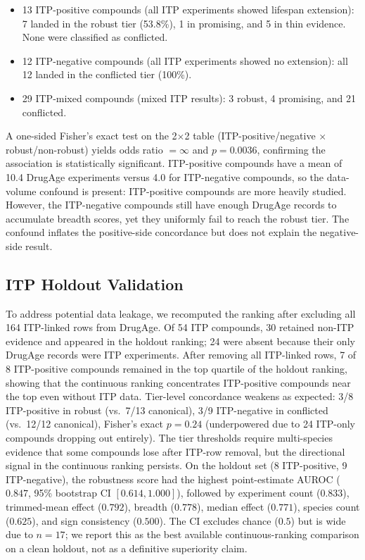 \documentclass[11pt]{article}
\begin{document}
\begin{itemize}
\item 13 ITP-positive compounds (all ITP experiments showed lifespan extension): 7 landed in the robust tier (53.8\%), 1 in promising, and 5 in thin evidence. None were classified as conflicted.
\item 12 ITP-negative compounds (all ITP experiments showed no extension): all 12 landed in the conflicted tier (100\%).
\item 29 ITP-mixed compounds (mixed ITP results): 3 robust, 4 promising, and 21 conflicted.
\end{itemize}

A one-sided Fisher's exact test on the 2$\times$2 table (ITP-positive/negative $\times$ robust/non-robust) yields odds ratio $= \infty$ and $p = 0.0036$, confirming the association is statistically significant. ITP-positive compounds have a mean of 10.4 DrugAge experiments versus 4.0 for ITP-negative compounds, so the data-volume confound is present: ITP-positive compounds are more heavily studied. However, the ITP-negative compounds still have enough DrugAge records to accumulate breadth scores, yet they uniformly fail to reach the robust tier. The confound inflates the positive-side concordance but does not explain the negative-side result.

\subsection{ITP Holdout Validation}
\label{sec:itp-holdout}
To address potential data leakage, we recomputed the ranking after excluding all 164 ITP-linked rows from DrugAge. Of 54 ITP compounds, 30 retained non-ITP evidence and appeared in the holdout ranking; 24 were absent because their only DrugAge records were ITP experiments. After removing all ITP-linked rows, 7 of 8 ITP-positive compounds remained in the top quartile of the holdout ranking, showing that the continuous ranking concentrates ITP-positive compounds near the top even without ITP data. Tier-level concordance weakens as expected: 3/8 ITP-positive in robust (vs.\ 7/13 canonical), 3/9 ITP-negative in conflicted (vs.\ 12/12 canonical), Fisher's exact $p = 0.24$ (underpowered due to 24 ITP-only compounds dropping out entirely). The tier thresholds require multi-species evidence that some compounds lose after ITP-row removal, but the directional signal in the continuous ranking persists. On the holdout set (8 ITP-positive, 9 ITP-negative), the robustness score had the highest point-estimate AUROC ($0.847$, 95\% bootstrap CI $[0.614, 1.000]$), followed by experiment count ($0.833$), trimmed-mean effect ($0.792$), breadth ($0.778$), median effect ($0.771$), species count ($0.625$), and sign consistency ($0.500$). The CI excludes chance ($0.5$) but is wide due to $n = 17$; we report this as the best available continuous-ranking comparison on a clean holdout, not as a definitive superiority claim.
\end{document}

